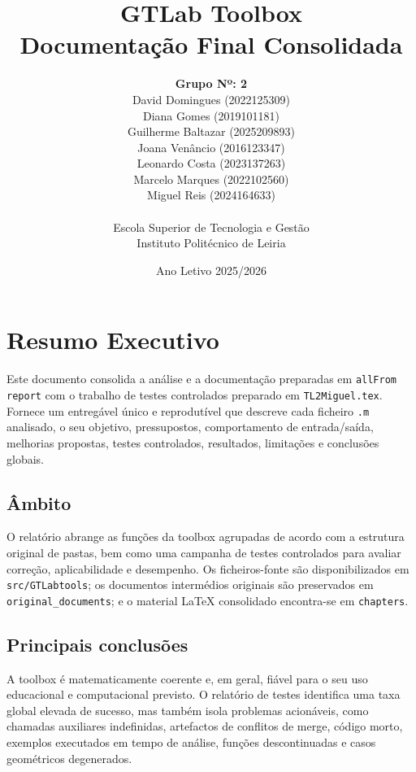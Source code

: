 \documentclass[12pt,a4paper]{report}
\title{GTLab Toolbox\\Documentação Final Consolidada}
\author{
    \textbf{Grupo Nº: 2} \\    
    David Domingues (2022125309) \\
    Diana Gomes (2019101181) \\
    Guilherme Baltazar (2025209893) \\
    Joana Venâncio (2016123347) \\
    Leonardo Costa (2023137263) \\
    Marcelo Marques (2022102560) \\
    Miguel Reis (2024164633) \\ \\
    Escola Superior de Tecnologia e Gestão \\
    Instituto Politécnico de Leiria
}\date{Ano Letivo 2025/2026}
\begin{document}
\maketitle
\tableofcontents
\clearpage
\chapter*{Resumo Executivo}
Este documento consolida a análise e a documentação preparadas em \texttt{allFrom report} com o trabalho de testes controlados preparado em \texttt{TL2Miguel.tex}. Fornece um entregável único e reprodutível que descreve cada ficheiro \texttt{.m} analisado, o seu objetivo, pressupostos, comportamento de entrada/saída, melhorias propostas, testes controlados, resultados, limitações e conclusões globais.

\section*{Âmbito}
O relatório abrange as funções da toolbox agrupadas de acordo com a estrutura original de pastas, bem como uma campanha de testes controlados para avaliar correção, aplicabilidade e desempenho. Os ficheiros-fonte são disponibilizados em \texttt{src/GTLabtools}; os documentos intermédios originais são preservados em \texttt{original\_documents}; e o material LaTeX consolidado encontra-se em \texttt{chapters}.

\section*{Principais conclusões}
A toolbox é matematicamente coerente e, em geral, fiável para o seu uso educacional e computacional previsto. O relatório de testes identifica uma taxa global elevada de sucesso, mas também isola problemas acionáveis, como chamadas auxiliares indefinidas, artefactos de conflitos de merge, código morto, exemplos executados em tempo de análise, funções descontinuadas e casos geométricos degenerados.
\end{document}

